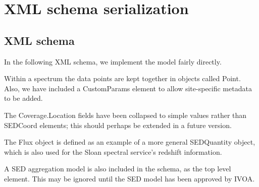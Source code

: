 \section{XML schema serialization}

\subsection{XML schema}

In the following XML schema, we implement the model fairly directly.

Within a spectrum the data points are kept together in objects called Point.
Also, we have included a CustomParams element to allow site-specific metadata to be added.

The Coverage.Location fields have been collapsed to simple values rather than SEDCoord elements; this should
perhaps be extended in a future version.

The Flux object is defined as an example of a more general SEDQuantity object, which is
also used for the Sloan spectral service's redshift information.

A SED aggregation model is also included in the schema, as the top level
element. This may be ignored until the SED model has been approved by IVOA.



